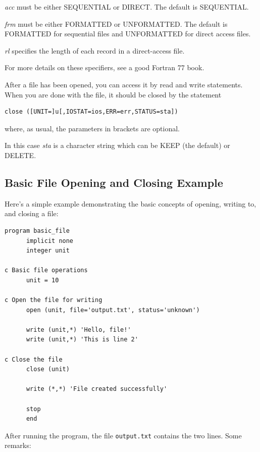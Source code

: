 \emph{acc} must be either SEQUENTIAL or DIRECT. The default is SEQUENTIAL.

\emph{frm} must be either FORMATTED or UNFORMATTED. The default is FORMATTED for sequential files and UNFORMATTED for direct access files.

\emph{rl} specifies the length of each record in a direct-access file.

For more details on these specifiers, see a good Fortran 77 book.

After a file has been opened, you can access it by read and write statements. When you are done with the file, it should be closed by the statement

\begin{lstlisting}[style=fortran77]
      close ([UNIT=]u[,IOSTAT=ios,ERR=err,STATUS=sta])
\end{lstlisting}

where, as usual, the parameters in brackets are optional.

In this case \emph{sta} is a character string which can be KEEP (the default) or DELETE.

\subsection{Basic File Opening and Closing Example}

Here's a simple example demonstrating the basic concepts of opening, writing to, and closing a file:

\begin{lstlisting}[style=fortran77]
      program basic_file
      implicit none
      integer unit

c Basic file operations
      unit = 10

c Open the file for writing
      open (unit, file='output.txt', status='unknown')

      write (unit,*) 'Hello, file!'
      write (unit,*) 'This is line 2'

c Close the file
      close (unit)

      write (*,*) 'File created successfully'

      stop
      end
\end{lstlisting}

After running the program, the file \texttt{output.txt} contains the two lines. Some remarks:

